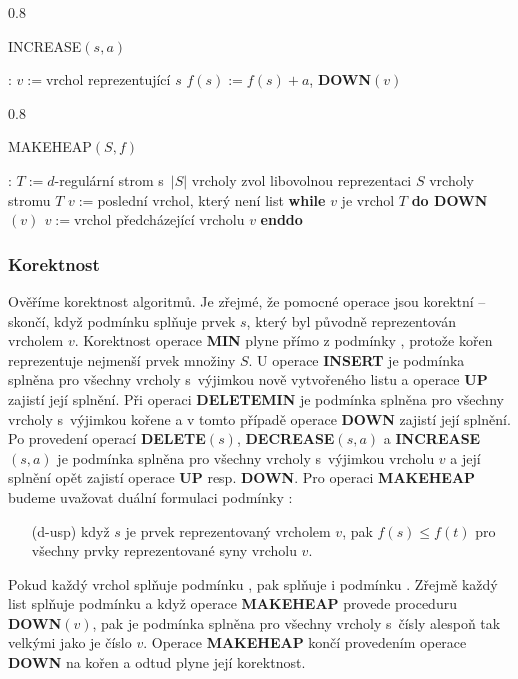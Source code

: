 \documentclass[a4paper,12pt]{article}
\newcommand{\algoritmus}[1]{
  {
  \setlength\fboxrule{0.5pt}

  \begin{boxedminipage}{0.8\textwidth}

 #1
  \end{boxedminipage}

  }
  }
\begin{document}
{{}}\algoritmus{{\bf

INCREASE$(s,a)$}:\newline 
$v:=$vrchol reprezentující $s$\newline 
$f(s):=f(s)+a$, {\bf DOWN$(v)$
}}\algoritmus{{\bf

MAKEHEAP$(S,f)$}:\newline 
$T:=d$-regulární strom s~$|S|$ vrcholy\newline 
zvol libovolnou reprezentaci $S$ vrcholy stromu $T$\newline 
$v:=$poslední vrchol, který není list\newline 
{\bf while} $v$ je vrchol $T$ {\bf do\newline 
\phantom{{\rm ---}}DOWN$(v)$\newline 
\phantom{{\rm ---}}$v:=$}vrchol předcházející 
vrcholu $v$\newline 
{\bf enddo
}}
\subsubsection{Korektnost}
Ověříme korektnost algoritmů.  Je zřejmé, že 
pomocné operace jsou korektní -- skončí, když podmínku 
 splňuje prvek $s$, který byl původně 
reprezentován vrcholem $v$. Korektnost operace {\bf MIN} plyne 
přímo z podmínky , protože kořen reprezentuje nejmenší 
prvek množiny $S$. U operace {\bf INSERT} je podmínka 
 splněna pro všechny vrcholy s~výjimkou nově 
vytvořeného listu a operace {\bf UP} zajistí její splnění.  Při 
operaci {\bf DELETEMIN} je pod\-mín\-ka  splněna pro 
všechny vrcholy s~výjimkou kořene a v tomto případě ope\-race {\bf DOWN} zajistí 
její splnění.  Po provedení operací {\bf DE\-LE\-TE$
(s)$}, {\bf DECREASE$(s,a)$ }
a {\bf INCREASE$(s,a)$} je pod\-mín\-ka  splněna pro 
všechny vrcholy s~výjimkou vrcholu $v$ a její splnění 
opět zajistí operace {\bf UP }
resp. {\bf DOWN}.  Pro operaci {\bf MAKEHEAP }
budeme uvažovat duální formulaci podmínky :  
\begin{enumerate}
\item[{(d-usp)}]
když $s$ je prvek reprezentovaný vrcholem $v$, pak 
$f(s)\le f(t)$ pro všechny prvky reprezentované syny 
vrcholu $v$. 
\end{enumerate}
Pokud každý vrchol splňuje podmínku , pak 
splňuje i pod\-mínku . Zřejmě každý list splňuje 
podmínku  a když ope\-race {\bf MAKEHEAP }
provede proceduru {\bf DOWN$(v)$}, pak je podmínka 
 splněna pro všechny vrcholy s~čísly alespoň tak velkými jako je číslo $v$. 
Operace {\bf MAKEHEAP} končí provedením operace {\bf DOWN} na 
kořen a odtud plyne její korektnost.
\end{document}
